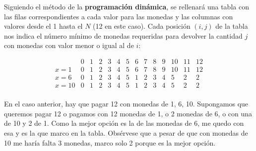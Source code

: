 Siguiendo el método de la \textbf{programación dinámica}, se rellenará una tabla con las filas correspondientes a cada valor para las monedas y las columnas con valores desde el 1 hasta el \(N\) (12 en este caso). Cada posición \((i, j)\) de la tabla nos indica el número mínimo de monedas requeridas para devolver la cantidad \(j\) con monedas con valor menor o igual al de \(i\):

\[
\begin{array}{c|ccccccccccccc}
 & 0 & 1 & 2 & 3 & 4 & 5 & 6 & 7 & 8 & 9 & 10 & 11 & 12 \\ \hline
x = 1 & 0 & 1 & 2 & 3 & 4 & 5 & 6 & 7 & 8 & 9 & 10 & 11 & 12 \\
x = 6 & 0 & 1 & 2 & 3 & 4 & 5 & 1 & 2 & 3 & 4 & 5 & 2 & 2 \\
x = 10 & 0 & 1 & 2 & 3 & 4 & 5 & 1 & 2 & 3 & 4 & 5 & 2 & 2 \\
\end{array}
\]

En el caso anterior, hay que pagar 12 con monedas de 1, 6, 10. Supongamos que queremos pagar 12 o pagamos con 12 monedas de 1, o 2 monedas de 6, o con una de 10 y 2 de 1. Como la mejor opción es la de las monedas de 6, me quedo con esa y es la que marco en la tabla. Obsérvese que a pesar de que con monedas de 10 me haría falta 3 monedas, marco solo 2 porque es la mejor opción.

